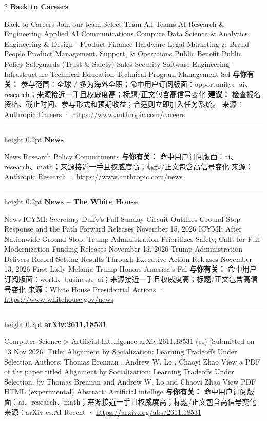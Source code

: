 \documentclass[10.5pt]{ctexart}
\begin{document}
\begin{multicols}{2}
{\large\bfseries Back to Careers}\par
Back to Careers Join our team Select Team All Teams AI Research \& Engineering Applied AI Communications Compute Data Science \& Analytics Engineering \& Design - Product Finance Hardware Legal Marketing \& Brand People Product Management, Support, \& Operations Public Benefit Public Policy Safeguards (Trust \& Safety) Sales Security Software Engineering - Infrastructure Technical Education Technical Program Management Sel
\textbf{与你有关：} 参与范围：全球 / 多为海外全职；命中用户订阅版面：opportunity、ai、research；来源接近一手且权威度高；标题/正文包含高信号变化
\textbf{建议：} 检查报名资格、截止时间、参与形式和预期收益；合适则立即加入任务系统。
{\footnotesize\color{ormuted} 来源：Anthropic Careers · \url{https://www.anthropic.com/careers}}
\vspace{2mm}
\hrule height 0.2pt
\vspace{2mm}
{\large\bfseries News}\par
News Research Policy Commitments
\textbf{与你有关：} 命中用户订阅版面：ai、research、math；来源接近一手且权威度高；标题/正文包含高信号变化
{\footnotesize\color{ormuted} 来源：Anthropic Research · \url{https://www.anthropic.com/news}}
\vspace{2mm}
\hrule height 0.2pt
\vspace{2mm}
{\large\bfseries News – The White House}\par
News ICYMI: Secretary Duffy’s Full Sunday Circuit Outlines Ground Stop Response and the Path Forward Releases November 15, 2026 ICYMI: After Nationwide Ground Stop, Trump Administration Prioritizes Safety, Calls for Full Modernization Funding Releases November 13, 2026 Trump Administration Delivers Record-Setting Results Through Executive Action Releases November 13, 2026 First Lady Melania Trump Honors America’s Fal
\textbf{与你有关：} 命中用户订阅版面：world、business、ai；来源接近一手且权威度高；标题/正文包含高信号变化
{\footnotesize\color{ormuted} 来源：White House Presidential Actions · \url{https://www.whitehouse.gov/news}}
\vspace{2mm}
\hrule height 0.2pt
\vspace{2mm}
{\large\bfseries arXiv:2611.18531}\par
Computer Science > Artificial Intelligence arXiv:2611.18531 (cs) [Submitted on 13 Nov 2026] Title: Alignment by Socialization: Learning Tradeoffs Under Selection Authors: Thomas Brennan , Andrew W. Lo , Chaoyi Zhao View a PDF of the paper titled Alignment by Socialization: Learning Tradeoffs Under Selection, by Thomas Brennan and Andrew W. Lo and Chaoyi Zhao View PDF HTML (experimental) Abstract: Artificial intellige
\textbf{与你有关：} 命中用户订阅版面：ai、research、math；来源接近一手且权威度高；标题/正文包含高信号变化
{\footnotesize\color{ormuted} 来源：arXiv cs.AI Recent · \url{https://arxiv.org/abs/2611.18531}}
\end{multicols}
\end{document}
